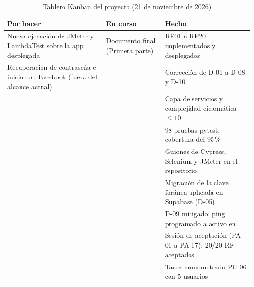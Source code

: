 \begin{table}[H]
\caption{Tablero Kanban del proyecto (21 de noviembre de 2026)}
\label{tab:kanban}
\small
\begin{tabularx}{\linewidth}{Y Y Y}
\toprule
\textbf{Por hacer} & \textbf{En curso} & \textbf{Hecho} \\
\midrule
Nueva ejecución de JMeter y LambdaTest sobre la app desplegada &
Documento final (Primera parte) &
RF01 a RF20 implementados y desplegados \\
Recuperación de contraseña e inicio con Facebook (fuera del alcance actual) &
&
Corrección de D-01 a D-08 y D-10 \\
&
&
Capa de servicios y complejidad ciclomática $\leq 10$ \\
&
&
98 pruebas pytest, cobertura del 95\,\% \\
&
&
Guiones de Cypress, Selenium y JMeter en el repositorio \\
&
&
Migración de la clave foránea aplicada en Supabase (D-05) \\
&
&
D-09 mitigado: ping programado a  activo en  \\
&
&
Sesión de aceptación (PA-01 a PA-17): 20/20 RF aceptados \\
&
&
Tarea cronometrada PU-06 con 5 usuarios \\
\bottomrule
\end{tabularx}
\end{table}
